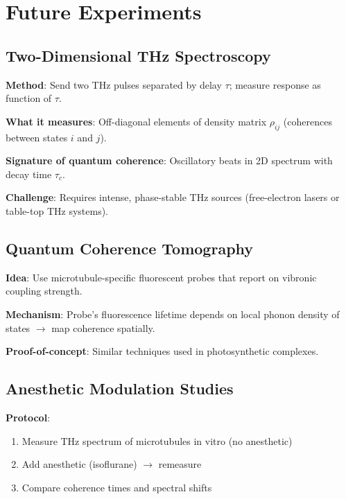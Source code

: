 \section{Future Experiments}\label{future-experiments}

\subsection{Two-Dimensional THz Spectroscopy}\label{two-dimensional-thz-spectroscopy}

\textbf{Method}: Send two THz pulses separated by delay $\tau$; measure response as function of $\tau$.

\textbf{What it measures}: Off-diagonal elements of density matrix $\rho_{ij}$ (coherences between states $i$ and $j$).

\textbf{Signature of quantum coherence}: Oscillatory beats in 2D spectrum with decay time $\tau_c$.

\textbf{Challenge}: Requires intense, phase-stable THz sources (free-electron lasers or table-top THz systems).

\subsection{Quantum Coherence Tomography}\label{quantum-coherence-tomography}

\textbf{Idea}: Use microtubule-specific fluorescent probes that report on vibronic coupling strength.

\textbf{Mechanism}: Probe's fluorescence lifetime depends on local phonon density of states $\rightarrow$ map coherence spatially.

\textbf{Proof-of-concept}: Similar techniques used in photosynthetic complexes.

\subsection{Anesthetic Modulation Studies}\label{anesthetic-modulation-studies}

\textbf{Protocol}:
\begin{enumerate}
\item Measure THz spectrum of microtubules in vitro (no anesthetic)
\item Add anesthetic (isoflurane) $\rightarrow$ remeasure
\item Compare coherence times and spectral shifts
\end{enumerate}

